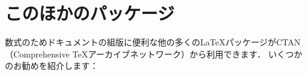 
\section{このほかのパッケージ}
\label{other-packages}

数式のためドキュメントの組版に便利な他の多くの\LaTeX{}パッケージがCTAN（Comprehensive \TeX{}アーカイブネットワーク）から利用できます．
いくつかのお勧めを紹介します：
